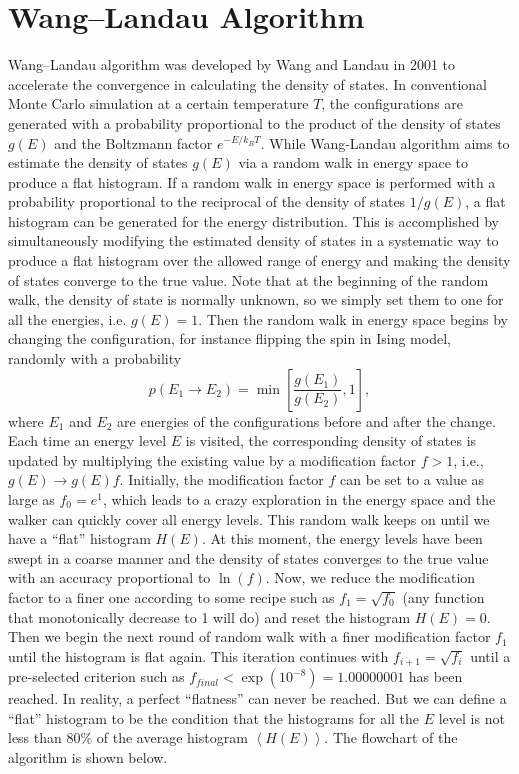 \section{Wang--Landau Algorithm\label{Sec:ES:Wang--Landau}}
Wang--Landau algorithm was developed by Wang and Landau in 2001 to accelerate the convergence in calculating the density of states.\cite{WangPRL2001} In conventional Monte Carlo simulation at a certain temperature $T$, the configurations are generated with a probability proportional to the product of the density of states $g(E)$ and the Boltzmann factor $e^{-E/k_BT}$. While Wang-Landau algorithm aims to estimate the density of states $g(E)$ via a random walk in energy space to produce a flat histogram. If a random walk in energy space is performed with a probability proportional to the reciprocal of the density of states $1/g(E)$, a flat histogram can be generated for the energy distribution. This is accomplished by simultaneously modifying the estimated density of states in a systematic way to produce a flat histogram over the allowed range of energy and making the density of states converge to the true value. Note that at the beginning of the random walk, the density of state is normally unknown, so we simply set them to one for all the energies, i.e. $g(E)=1$. Then the random walk in energy space begins by changing the configuration, for instance flipping the spin in Ising model, randomly with a probability
\begin{equation}
    p(E_1\to E_2)=\min\left[\frac{g(E_1)}{g(E_2)},1\right],
\end{equation}
where $E_1$ and $E_2$ are energies of the configurations before and after the change. Each time an energy level $E$ is visited, the corresponding density of states is updated by multiplying the existing value by a modification factor $f>1$, i.e., $g(E)\to g(E)f$. Initially, the modification factor $f$ can be set to a value as large as $f_0=e^1$, which leads to a crazy exploration in the energy space and the walker can quickly cover all energy levels. This random walk keeps on until we have a ``flat'' histogram $H(E)$. At this moment, the energy levels have been swept in a coarse manner and the density of states converges to the true value with an accuracy proportional to $\ln{(f)}$. Now, we reduce the modification factor to a finer one according to some recipe such as $f_1=\sqrt{f_0}$ (any function that monotonically decrease to 1 will do) and reset the histogram $H(E)=0$. Then we begin the next round of random walk with a finer modification factor $f_1$ until the histogram is flat again. This iteration continues with $f_{i+1}=\sqrt{f_i}$ until a pre-selected criterion such as $f_{final}<\exp(10^{-8})=1.00000001$ has been reached. In reality, a perfect ``flatness'' can never be reached. But we can define a ``flat'' histogram to be the condition that the histograms for all the $E$ level is not less than 80\% of the average histogram $\left<H(E)\right>$. The flowchart of the algorithm  is shown below.
